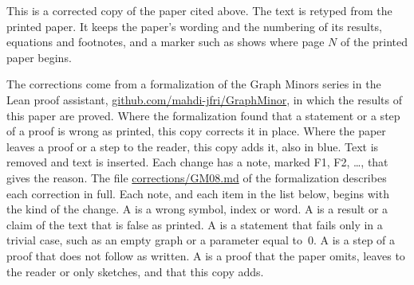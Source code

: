 
This is a corrected copy of the paper cited above. The text is retyped from the printed paper.
It keeps the paper's wording and the numbering of its results, equations and footnotes, and a
marker such as  shows where page $N$ of the printed paper begins.

The corrections come from a formalization of the Graph Minors series in the Lean proof
assistant, \href{https://github.com/mahdi-jfri/GraphMinor}{github.com/mahdi-jfri/GraphMinor},
in which the results of this paper are proved. Where the formalization found that a statement
or a step of a proof is wrong as printed, this copy corrects it in place. Where the paper leaves a proof or a step to the reader, this copy adds it, also in blue. Text  is removed and text  is inserted. Each change has a note, marked
\textcolor{fixcolor}{\sffamily F1}, \textcolor{fixcolor}{\sffamily F2}, \dots, that gives the
reason. The file
\href{https://github.com/mahdi-jfri/GraphMinor/blob/main/corrections/GM08.md}{corrections/GM08.md}
of the formalization describes each correction in full. Each note, and each item in the list below, begins with the kind of the change. A  is a wrong symbol, index or word. A  is a result or a claim of the text that is false as printed. A  is a statement that fails only in a trivial case, such as an empty graph or a parameter equal to~$0$. A  is a step of a proof that does not follow as written. A  is a proof that the paper omits, leaves to the reader or only sketches, and that this copy adds.

